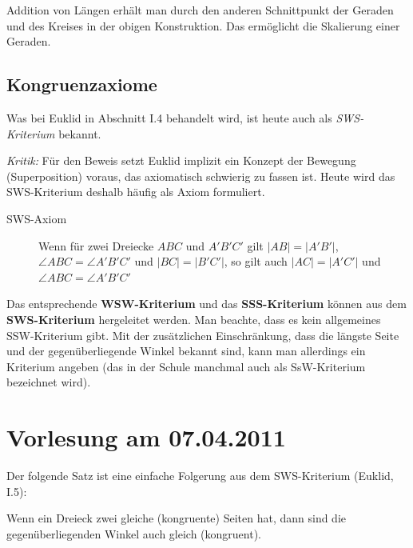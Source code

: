 Addition von Längen erhält man durch den anderen Schnittpunkt der Geraden und des Kreises in der
obigen Konstruktion. Das ermöglicht die Skalierung einer Geraden.

\subsection*{Kongruenzaxiome}

Was bei Euklid in Abschnitt I.4 behandelt wird, ist heute auch als {\em SWS-Kriterium} bekannt.

{\em Kritik:} Für den Beweis setzt Euklid implizit ein Konzept der Bewegung (Superposition) voraus,
das axiomatisch schwierig zu fassen ist. Heute wird das SWS-Kriterium deshalb häufig als Axiom
formuliert.


\begin{description}
    \item[SWS-Axiom] Wenn für zwei Dreiecke $ABC$ und $A'B'C'$ gilt $|AB|=|A'B'|$, $\angle ABC =
        \angle A'B'C'$ und $|BC|=|B'C'|$, so gilt auch $|AC|=|A'C'|$ und $\angle ABC = \angle
        A'B'C'$
\end{description}

Das entsprechende {\bf WSW-Kriterium} und das {\bf SSS-Kriterium} können aus dem {\bf
SWS-Kriterium} hergeleitet werden. Man beachte, dass es kein allgemeines SSW-Kriterium gibt. Mit
der zusätzlichen Einschränkung, dass die längste Seite und der gegenüberliegende Winkel bekannt
sind, kann man allerdings ein Kriterium angeben (das in der Schule manchmal auch als SsW-Kriterium
bezeichnet wird).

\section*{Vorlesung am 07.04.2011}

Der folgende Satz ist eine einfache Folgerung aus dem SWS-Kriterium (Euklid, I.5):

\begin{thm}
    Wenn ein Dreieck zwei gleiche (kongruente) Seiten hat, dann sind die gegenüberliegenden Winkel
    auch gleich (kongruent).
\end{thm}


